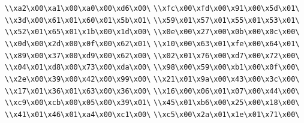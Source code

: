 \verb|\\xa2\x00\xa1\x00\xa0\x00\xd6\x00\|\newline
\verb|\\xfc\x00\xfd\x00\x91\x00\x5d\x01\|\newline
\verb|\\x3d\x00\x61\x01\x60\x01\x5b\x01\|\newline
\verb|\\x59\x01\x57\x01\x55\x01\x53\x01\|\newline
\verb|\\x52\x01\x65\x01\x1b\x00\x1d\x00\|\newline
\verb|\\x0e\x00\x27\x00\x0b\x00\x0c\x00\|\newline
\verb|\\x0d\x00\x2d\x00\x0f\x00\x62\x01\|\newline
\verb|\\x10\x00\x63\x01\xfe\x00\x64\x01\|\newline
\verb|\\x89\x00\x37\x00\xd9\x00\x62\x00\|\newline
\verb|\\x02\x01\x76\x00\xd7\x00\x72\x00\|\newline
\verb|\\x04\x01\xd8\x00\x73\x00\xda\x00\|\newline
\verb|\\x98\x00\x59\x00\xb1\x00\x0f\x00\|\newline
\verb|\\x2e\x00\x39\x00\x42\x00\x99\x00\|\newline
\verb|\\x21\x01\x9a\x00\x43\x00\x3c\x00\|\newline
\verb|\\x17\x01\x36\x01\x63\x00\x36\x00\|\newline
\verb|\\x16\x00\x06\x01\x07\x00\x44\x00\|\newline
\verb|\\xc9\x00\xcb\x00\x05\x00\x39\x01\|\newline
\verb|\\x45\x01\xb6\x00\x25\x00\x18\x00\|\newline
\verb|\\x41\x01\x46\x01\xa4\x00\xc1\x00\|\newline
\verb|\\xc5\x00\x2a\x01\x1e\x01\x71\x00\|\newline
